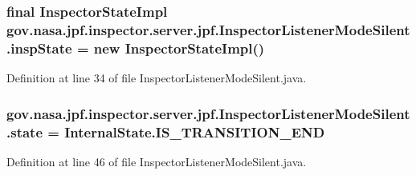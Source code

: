\subsubsection[{\texorpdfstring{insp\+State}{inspState}}]{\setlength{\rightskip}{0pt plus 5cm}final {\bf Inspector\+State\+Impl} gov.\+nasa.\+jpf.\+inspector.\+server.\+jpf.\+Inspector\+Listener\+Mode\+Silent.\+insp\+State = new {\bf Inspector\+State\+Impl}()\hspace{0.3cm}{\ttfamily [private]}}\hypertarget{classgov_1_1nasa_1_1jpf_1_1inspector_1_1server_1_1jpf_1_1_inspector_listener_mode_silent_a255fccac41764243ae61016a30bb053e}{}\label{classgov_1_1nasa_1_1jpf_1_1inspector_1_1server_1_1jpf_1_1_inspector_listener_mode_silent_a255fccac41764243ae61016a30bb053e}


Definition at line 34 of file Inspector\+Listener\+Mode\+Silent.\+java.

\subsubsection[{\texorpdfstring{state}{state}}]{ gov.\+nasa.\+jpf.\+inspector.\+server.\+jpf.\+Inspector\+Listener\+Mode\+Silent.\+state = {\bf Internal\+State.\+I\+S\+\_\+\+T\+R\+A\+N\+S\+I\+T\+I\+O\+N\+\_\+\+E\+ND}\hspace{0.3cm}{\ttfamily [private]}}\hypertarget{classgov_1_1nasa_1_1jpf_1_1inspector_1_1server_1_1jpf_1_1_inspector_listener_mode_silent_ae3c50b2d5f0793f31814abb26adbf6e4}{}\label{classgov_1_1nasa_1_1jpf_1_1inspector_1_1server_1_1jpf_1_1_inspector_listener_mode_silent_ae3c50b2d5f0793f31814abb26adbf6e4}


Definition at line 46 of file Inspector\+Listener\+Mode\+Silent.\+java.


